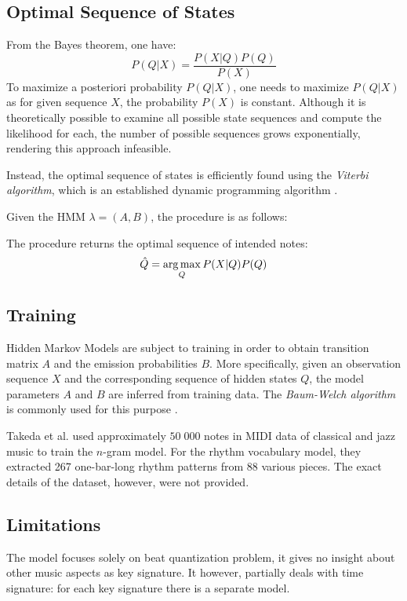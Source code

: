 \subsection{Optimal Sequence of States}

From the Bayes theorem, one have: \[P(Q|X)=\frac{P(X|Q)P(Q)}{P(X)}\] To maximize a posteriori probability $P(Q|X)$, one needs to maximize $P(Q|X)$ as for given sequence $X$, the probability $P(X)$ is constant. Although it is theoretically possible to examine all possible state sequences and compute the likelihood for each, the number of possible sequences grows exponentially, rendering this approach infeasible.

Instead, the optimal sequence of states is efficiently found using the \emph{Viterbi algorithm}, which is an established dynamic programming algorithm  \cite[p.210--220]{Jurafsky2009}. 

Given the HMM $\lambda = (A, B)$, the procedure is as follows:



The procedure returns the optimal sequence of intended notes: \[\hat{Q} = \argmax_Q P(X|Q)P(Q)\]

\subsection{Training}

Hidden Markov Models are subject to training in order to obtain transition matrix $A$ and the emission probabilities $B$. More specifically, given an observation sequence $X$ and the corresponding sequence of hidden states $Q$, the model parameters $A$ and $B$ are inferred from training data. The \emph{Baum-Welch algorithm} is commonly used for this purpose \cite[p. 220--226]{Jurafsky2009}.

Takeda et al. used approximately $50\;000$ notes in MIDI data of classical and jazz music to train the $n$-gram model. For the rhythm vocabulary model, they extracted 267 one-bar-long rhythm patterns from 88 various pieces. The exact details of the dataset, however, were not provided.

\subsection{Limitations}

The model focuses solely on beat quantization problem, it gives no insight about other music aspects as key signature. It however, partially deals with time signature: for each key signature there is a separate model.

